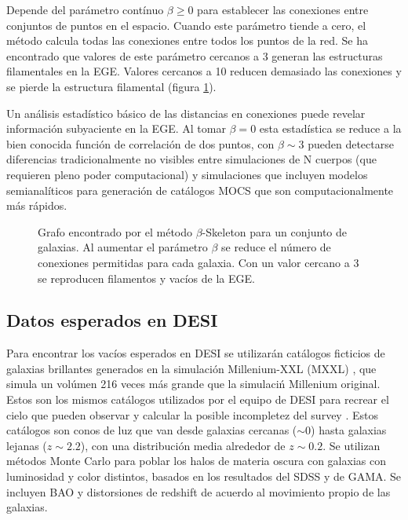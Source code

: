 \documentclass[preprint]{aastex62}
\begin{document}
  Depende del parámetro contínuo $\beta \geq 0$ para establecer las conexiones entre conjuntos de
  puntos en el espacio. Cuando este parámetro tiende a cero, el método calcula todas las conexiones
  entre todos los puntos de la red. Se ha encontrado que valores de este parámetro cercanos a 3
  generan las estructuras filamentales en la EGE. Valores cercanos a 10 reducen demasiado las
  conexiones y se pierde la estructura filamental (figura \ref{fig:beta_skeleton_analysis}). 

  Un análisis estadístico básico de las distancias en conexiones puede revelar información subyaciente
  en la EGE. Al tomar $\beta = 0$ esta estadística se reduce a la bien conocida función de correlación
  de dos puntos, con $\beta \sim 3$ pueden detectarse diferencias tradicionalmente no visibles entre
  simulaciones de N cuerpos (que requieren pleno poder computacional) y simulaciones que incluyen
  modelos semianalíticos para generación de catálogos MOCS que son computacionalmente más rápidos.
  \begin{figure}
    \caption{Grafo encontrado por el método $\beta$-Skeleton para un conjunto de galaxias. Al aumentar el
      parámetro $\beta$ se reduce el número de conexiones permitidas para cada galaxia. Con un valor cercano
      a 3 se reproducen filamentos y vacíos de la EGE.
      \citep{Fang2018} \label{fig:beta_skeleton_analysis}}
  \end{figure}

  \subsection{Datos esperados en DESI}
  Para encontrar los vacíos esperados en DESI se utilizarán catálogos
  ficticios de galaxias brillantes
  generados en la simulación Millenium-XXL (MXXL) \citep{Smith2017}, que simula un
  volúmen 216 veces más grande que la simulaciń Millenium original. Estos
  son los mismos catálogos utilizados por el equipo de DESI para recrear el cielo que pueden
  observar y calcular la posible incompletez del survey \citep{Smith2018}.
  Estos catálogos son conos de luz que van
  desde galaxias cercanas ($\sim0$) hasta galaxias lejanas ($z\sim2.2$), con una distribución
  media alrededor de $z\sim 0.2$. Se utilizan métodos Monte Carlo para poblar los halos de materia
  oscura con galaxias con luminosidad y color distintos, basados en los resultados del SDSS y de
  GAMA. Se incluyen BAO y distorsiones de redshift de acuerdo al movimiento propio de las galaxias.
  
\end{document}
